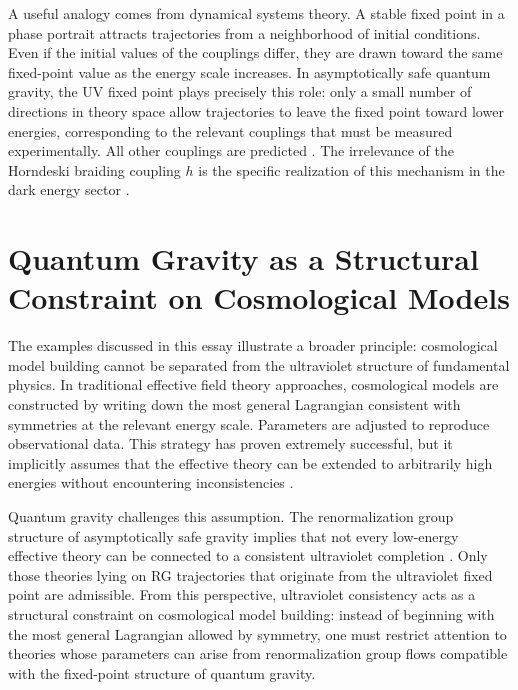\documentclass[12pt,a4paper]{article}
\begin{document}
A useful analogy comes from dynamical systems theory. A stable fixed point in
a phase portrait attracts trajectories from a neighborhood of initial conditions.
Even if the initial values of the couplings differ, they are drawn toward the
same fixed-point value as the energy scale increases. In asymptotically safe
quantum gravity, the UV fixed point plays precisely this role: only a small
number of directions in theory space allow trajectories to leave the fixed point
toward lower energies, corresponding to the relevant couplings that must be
measured experimentally. All other couplings are predicted \cite{Eichhorn2019,
ReuterSaueressig2012}. The irrelevance of the Horndeski braiding coupling $h$
is the specific realization of this mechanism in the dark energy sector
\cite{EichhornLinoWagner2023}.

\section{Quantum Gravity as a Structural Constraint on Cosmological Models}

The examples discussed in this essay illustrate a broader principle: cosmological
model building cannot be separated from the ultraviolet structure of fundamental
physics. In traditional effective field theory approaches, cosmological models
are constructed by writing down the most general Lagrangian consistent with
symmetries at the relevant energy scale. Parameters are adjusted to reproduce
observational data. This strategy has proven extremely successful, but it
implicitly assumes that the effective theory can be extended to arbitrarily high
energies without encountering inconsistencies \cite{Polchinski1984,ZinnJustin2002}.

Quantum gravity challenges this assumption. The renormalization group structure
of asymptotically safe gravity implies that not every low-energy effective theory
can be connected to a consistent ultraviolet completion
\cite{Weinberg1979,Reuter1998,Eichhorn2019}. Only those theories lying on RG
trajectories that originate from the ultraviolet fixed point are admissible.
From this perspective, ultraviolet consistency acts as a structural constraint
on cosmological model building: instead of beginning with the most general
Lagrangian allowed by symmetry, one must restrict attention to theories whose
parameters can arise from renormalization group flows compatible with the
fixed-point structure of quantum gravity.
\end{document}
